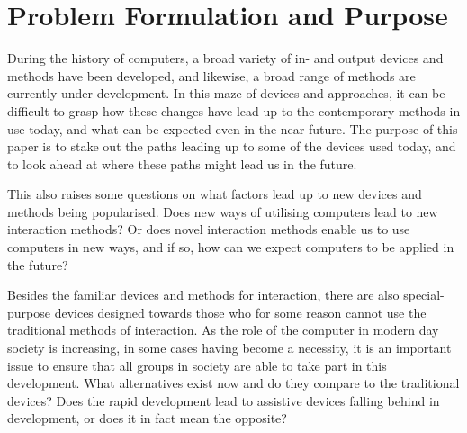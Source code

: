 
\section{Problem Formulation and Purpose}
During the history of computers, a broad variety of in- and output devices and methods have been developed, and likewise, a broad range of methods are currently under development. In this maze of devices and approaches, it can be difficult to grasp how these changes have lead up to the contemporary methods in use today, and what can be expected even in the near future. The purpose of this paper is to stake out the paths leading up to some of the devices used today, and to look ahead at where these paths might lead us in the future.

This also raises some questions on what factors lead up to new devices and methods being popularised. Does new ways of utilising computers lead to new interaction methods? Or does novel interaction methods enable us to use computers in new ways, and if so, how can we expect computers to be applied in the future?

Besides the familiar devices and methods for interaction, there are also special-purpose devices designed towards those who for some reason cannot use the traditional methods of interaction. As the role of the computer in modern day society is increasing, in some cases having become a necessity, it is an important issue to ensure that all groups in society are able to take part in this development. What alternatives exist now and do they compare to the traditional devices? Does the rapid development lead to assistive devices falling behind  in development, or does it in fact mean the opposite?

